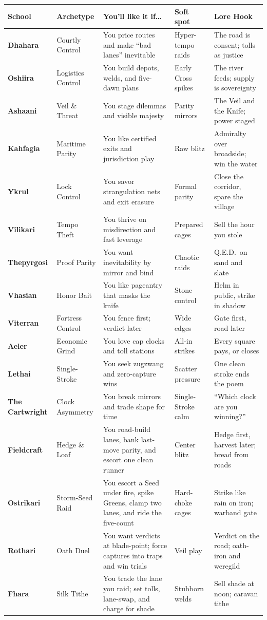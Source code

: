 \documentclass[11pt]{article}
\begin{document}
\begin{tabularx}{\linewidth}{@{}>{\bfseries}p{2.1cm} L L L L@{}}
\toprule
School & Archetype & You’ll like it if… & Soft spot & Lore Hook \\
\midrule
Dhahara    & Courtly Control   & You price routes and make “bad lanes” inevitable & Hyper-tempo raids & The road is consent; tolls as justice \\
Oshiira    & Logistics Control & You build depots, welds, and five-dawn plans     & Early Cross spikes & The river feeds; supply is sovereignty \\
Ashaani    & Veil \& Threat    & You stage dilemmas and visible majesty           & Parity mirrors     & The Veil and the Knife; power staged \\
Kahfagia   & Maritime Parity   & You like certified exits and jurisdiction play   & Raw blitz          & Admiralty over broadside; win the water \\
Ykrul      & Lock Control      & You savor strangulation nets and exit erasure    & Formal parity      & Close the corridor, spare the village \\
Vilikari   & Tempo Theft       & You thrive on misdirection and fast leverage     & Prepared cages     & Sell the hour you stole \\
Thepyrgosi & Proof Parity      & You want inevitability by mirror and bind        & Chaotic raids      & Q.E.D.\ on sand and slate \\
Vhasian    & Honor Bait        & You like pageantry that masks the knife          & Stone control      & Helm in public, strike in shadow \\
Viterran   & Fortress Control  & You fence first; verdict later                   & Wide edges         & Gate first, road later \\
Aeler      & Economic Grind    & You love cap clocks and toll stations            & All-in strikes     & Every square pays, or closes \\
Lethai     & Single-Stroke     & You seek zugzwang and zero-capture wins          & Scatter pressure   & One clean stroke ends the poem \\
The Cartwright & Clock Asymmetry   & You break mirrors and trade shape for time       & Single-Stroke calm & “Which clock are you winning?” \\
Fieldcraft  & Hedge \& Loaf  & You road-build lanes, bank last-move parity, and escort one clean runner & Center blitz & Hedge first, harvest later; bread from roads \\
Ostrikari  & Storm-Seed Raid & You escort a Seed under fire, spike Greens, clamp two lanes, and ride the five-count & Hard-choke cages & Strike like rain on iron; warband gate \\
Rothari     & Oath Duel      & You want verdicts at blade-point; force captures into traps and win trials & Veil play & Verdict on the road; oath-iron and weregild \\
Fhara       & Silk Tithe     & You trade the lane you raid; set tolls, lane-swap, and charge for shade  & Stubborn welds & Sell shade at noon; caravan tithe \\
\bottomrule
\end{tabularx}
\end{document}
